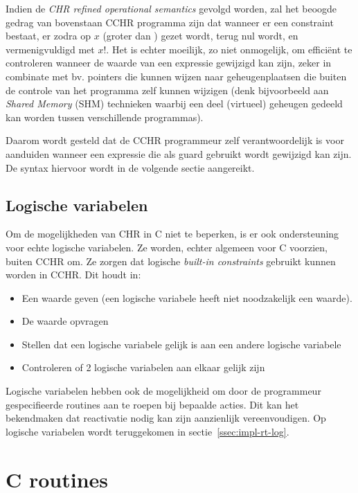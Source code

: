Indien de {\em CHR refined operational semantics} gevolgd worden, zal het beoogde gedrag van bovenstaan CCHR programma zijn dat wanneer er een  constraint bestaat, er zodra  op $x$ (groter dan ) gezet wordt,  terug nul wordt, en  vermenigvuldigd met $x!$. Het is echter moeilijk, zo niet onmogelijk, om effici\"ent te controleren wanneer de waarde van een expressie gewijzigd kan zijn, zeker in combinate met bv. pointers die kunnen wijzen naar geheugenplaatsen die buiten de controle van het programma zelf kunnen wijzigen (denk bijvoorbeeld aan {\em Shared Memory} (SHM) technieken waarbij een deel (virtueel) geheugen gedeeld kan worden tussen verschillende programmas).

Daarom wordt gesteld dat de CCHR programmeur zelf verantwoordelijk is voor aanduiden wanneer een expressie die als guard gebruikt wordt gewijzigd kan zijn. De syntax hiervoor wordt in de volgende sectie aangereikt.

\subsection{Logische variabelen}

Om de mogelijkheden van CHR in C niet te beperken, is er ook ondersteuning voor echte logische variabelen. Ze worden, echter algemeen voor C voorzien, buiten CCHR om. Ze zorgen dat logische {\em built-in constraints} gebruikt kunnen worden in CCHR. Dit houdt in: \begin{itemize}
  \item Een waarde geven (een logische variabele heeft niet noodzakelijk een waarde).
  \item De waarde opvragen
  \item Stellen dat een logische variabele gelijk is aan een andere logische variabele
  \item Controleren of 2 logische variabelen aan elkaar gelijk zijn
\end{itemize}

Logische variabelen hebben ook de mogelijkheid om door de programmeur gespecifieerde routines aan te roepen bij bepaalde acties. Dit kan het bekendmaken dat reactivatie nodig kan zijn aanzienlijk vereenvoudigen. Op logische variabelen wordt teruggekomen in sectie~\ref{ssec:impl-rt-log}.

\section{C routines} \label{taal:impl-crout}

